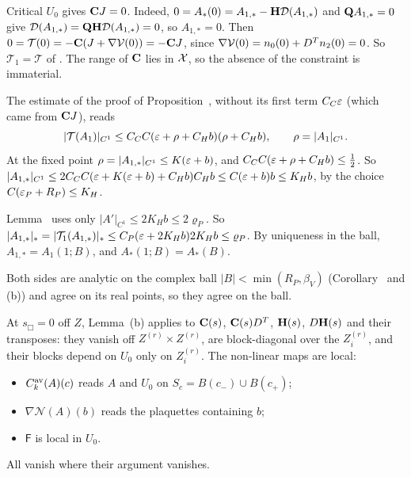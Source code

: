 \begin{detail}
\begin{step}[(c)]
Critical $U_0$ gives $\mathbf C J=0$. Indeed, $0=A_*(0)=A_{1,*}-\mathbf H\mathcal D(A_{1,*})$ and $\mathbf Q A_{1,*}=0$ give $\mathcal D(A_{1,*})=\mathbf Q\mathbf H\mathcal D(A_{1,*})=0$, so $A_{1,*}=0$. Then $0=\mathcal T(0)=-\mathbf C(J+\nabla\mathcal V(0))=-\mathbf C J$, since $\nabla\mathcal V(0)=n_0(0)+D^Tn_2(0)=0$. So $\mathcal T_1=\mathcal T$ of . The range of $\mathbf C$ lies in $\mathcal X$, so the absence of the constraint is immaterial.

The estimate of the proof of Proposition~, without its first term $C_C\varepsilon$ (which came from $\mathbf C J$), reads
\[
|\mathcal T(A_1)|_{C^1}\le C_CC(\varepsilon+\rho+C_Hb)(\rho+C_Hb),\qquad\rho=|A_1|_{C^1} .
\]
At the fixed point $\rho=|A_{1,*}|_{C^1}\le K(\varepsilon+b)$, and $C_CC(\varepsilon+\rho+C_Hb)\le\frac12$. So $|A_{1,*}|_{C^1}\le2C_CC(\varepsilon+K(\varepsilon+b)+C_Hb)C_Hb\le C(\varepsilon+b)b\le K_Hb$, by the choice $C(\varepsilon_P+R_P)\le K_H$.

Lemma~ uses only $|A'|_{C^1}\le2K_Hb\le2\varrho_P$. So $|A_{1,*}|_*=|\mathcal T_1(A_{1,*})|_*\le C_P(\varepsilon+2K_Hb)2K_Hb\le\varrho_P$. By uniqueness in the ball, $A_{1,*}=A_1(1;B)$, and $A_*(1;B)=A_*(B)$.

Both sides are analytic on the complex ball $|B|<\min(R_P,\beta_V)$ (Corollary~ and (b)) and agree on its real points, so they agree on the ball.
\end{step}
\begin{step}
At $s_\Box=0$ off $Z$, Lemma~(b) applies to $\mathbf C(s)$, $\mathbf C(s)D^T$, $\mathbf H(s)$, $D\mathbf H(s)$ and their transposes: they vanish off $Z^{(r)}\times Z^{(r)}$, are block-diagonal over the $Z_i^{(r)}$, and their blocks depend on $U_0$ only on $Z_i^{(r)}$. The non-linear maps are local:
\begin{itemize}
\item $C^{\rm av}_k(A)(c)$ reads $A$ and $U_0$ on $S_c=B(c_-)\cup B(c_+)$;
\item $\nabla\mathcal N(A)(b)$ reads the plaquettes containing $b$;
\item $\mathsf F$ is local in $U_0$.
\end{itemize}
All vanish where their argument vanishes.


\end{step}
\end{detail}
